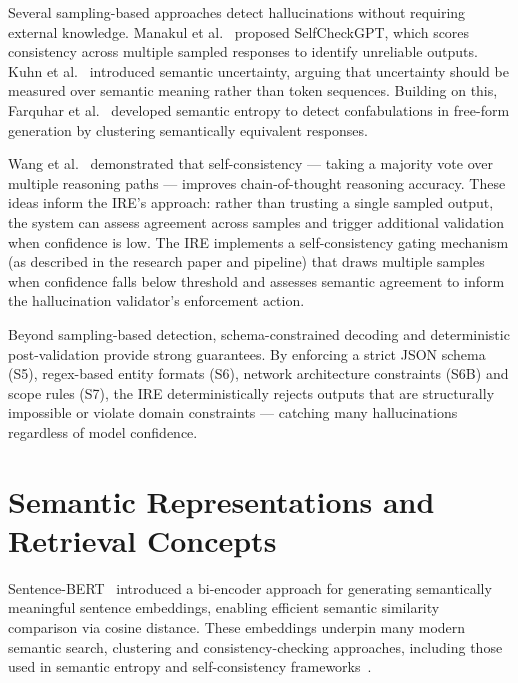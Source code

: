 Several sampling-based approaches detect hallucinations without requiring external knowledge. Manakul et al.~\cite{manakul2023selfcheckgpt} proposed SelfCheckGPT, which scores consistency across multiple sampled responses to identify unreliable outputs. Kuhn et al.~\cite{kuhn2023semantic} introduced semantic uncertainty, arguing that uncertainty should be measured over semantic meaning rather than token sequences. Building on this, Farquhar et al.~\cite{farquhar2024semantic} developed semantic entropy to detect confabulations in free-form generation by clustering semantically equivalent responses.

Wang et al.~\cite{wang2023selfconsistency} demonstrated that self-consistency — taking a majority vote over multiple reasoning paths — improves chain-of-thought reasoning accuracy. These ideas inform the IRE's approach: rather than trusting a single sampled output, the system can assess agreement across samples and trigger additional validation when confidence is low. The IRE implements a self-consistency gating mechanism (as described in the research paper and pipeline) that draws multiple samples when confidence falls below threshold and assesses semantic agreement to inform the hallucination validator's enforcement action.

Beyond sampling-based detection, schema-constrained decoding and deterministic post-validation provide strong guarantees. By enforcing a strict JSON schema (S5), regex-based entity formats (S6), network architecture constraints (S6B) and scope rules (S7), the IRE deterministically rejects outputs that are structurally impossible or violate domain constraints — catching many hallucinations regardless of model confidence.

\section{Semantic Representations and Retrieval Concepts}\label{sec:lit-semantic}

Sentence-BERT~\cite{reimers2019sbert} introduced a bi-encoder approach for generating semantically meaningful sentence embeddings, enabling efficient semantic similarity comparison via cosine distance. These embeddings underpin many modern semantic search, clustering and consistency-checking approaches, including those used in semantic entropy and self-consistency frameworks~\cite{farquhar2024semantic,kuhn2023semantic,wang2023selfconsistency}.

